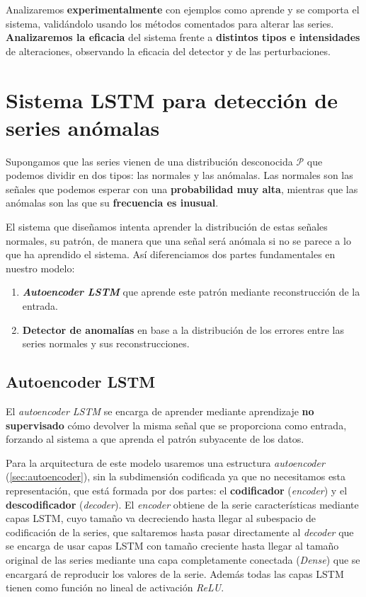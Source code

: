 Analizaremos \textbf{experimentalmente} con ejemplos como aprende y se comporta el sistema, validándolo usando los métodos comentados para alterar las series. \textbf{Analizaremos la eficacia} del sistema frente a \textbf{distintos tipos e intensidades} de alteraciones, observando la eficacia del detector y de las perturbaciones.

\chapter{Sistema LSTM para detección de series anómalas}\label{ch:ad-detector}

Supongamos que las series vienen de una distribución desconocida $\mathcal{P}$ que podemos dividir en dos tipos: las normales y las anómalas. Las normales son las señales que podemos esperar con una \textbf{probabilidad muy alta}, mientras que las anómalas son las que su \textbf{frecuencia es inusual}.

El sistema que diseñamos intenta aprender la distribución de estas señales normales, su patrón, de manera que una señal será anómala si no se parece a lo que ha aprendido el sistema. Así diferenciamos dos partes fundamentales en nuestro modelo:

\begin{enumerate}
  \item \textbf{\emph{Autoencoder LSTM}} que aprende este patrón mediante reconstrucción de la entrada.
  \item \textbf{Detector de anomalías} en base a la distribución de los errores entre las series normales y sus reconstrucciones.
\end{enumerate}

\section{Autoencoder LSTM}

El \emph{autoencoder LSTM} se encarga de aprender mediante aprendizaje \textbf{no supervisado} cómo devolver la misma señal que se proporciona como entrada, forzando al sistema a que aprenda el patrón subyacente de los datos.

Para la arquitectura de este modelo usaremos una estructura \emph{autoencoder} (\autoref{sec:autoencoder}), sin la subdimensión codificada ya que no necesitamos esta representación, que está formada por dos partes: el \textbf{codificador} (\emph{encoder}) y el \textbf{descodificador} (\emph{decoder}). El \emph{encoder} obtiene de la serie características mediante capas LSTM, cuyo tamaño va decreciendo hasta llegar al subespacio de codificación de la series, que saltaremos hasta pasar directamente al \emph{decoder} que se encarga de usar capas LSTM con tamaño creciente hasta llegar al tamaño original de las series mediante una capa completamente conectada (\emph{Dense}) que se encargará de reproducir los valores de la serie. Además todas las capas LSTM tienen como función no lineal de activación \emph{ReLU}.

